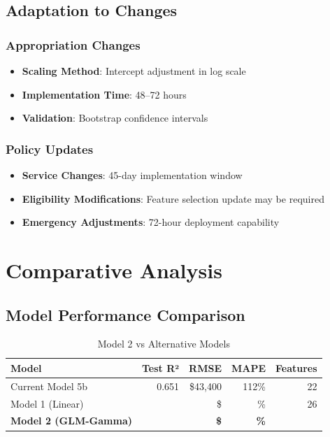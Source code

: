 \subsection{Adaptation to Changes}

\subsubsection{Appropriation Changes}
\begin{itemize}
    \item \textbf{Scaling Method}: Intercept adjustment in log scale
    \item \textbf{Implementation Time}: 48--72 hours
    \item \textbf{Validation}: Bootstrap confidence intervals
\end{itemize}

\subsubsection{Policy Updates}
\begin{itemize}
    \item \textbf{Service Changes}: 45-day implementation window
    \item \textbf{Eligibility Modifications}: Feature selection update may be required
    \item \textbf{Emergency Adjustments}: 72-hour deployment capability
\end{itemize}

\section{Comparative Analysis}

\subsection{Model Performance Comparison}

\begin{table}[h]
\centering
\caption{Model 2 vs Alternative Models}
\begin{tabular}{lrrrr}
\toprule
\textbf{Model} & \textbf{Test R²} & \textbf{RMSE} & \textbf{MAPE} & \textbf{Features} \\
\midrule
Current Model 5b & 0.651 & \$43,400 & 112\% & 22 \\
Model 1 (Linear) & \ModelOneRSquaredTest{} & \$\ModelOneRMSETest{} & \ModelOneMAPETest{}\% & 26 \\
\textbf{Model 2 (GLM-Gamma)} & \textbf{\ModelTwoRSquaredTest{}} & \textbf{\$\ModelTwoRMSETest{}} & \textbf{\ModelTwoMAPETest{}\%} & \textbf{\ModelTwoNumFeatures{}} \\
\bottomrule
\end{tabular}
\end{table}

